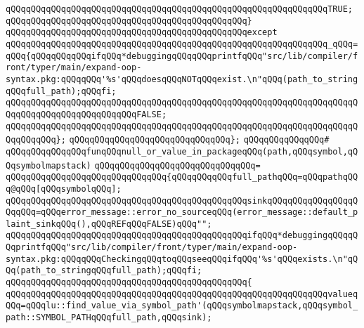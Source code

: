 \verb|qQQqqQQqqQQqqQQqqQQqqQQqqQQqqQQqqQQqqQQqqQQqqQQqqQQqqQQqqQQqqQQqTRUE;|\newline
\verb|qQQqqQQqqQQqqQQqqQQqqQQqqQQqqQQqqQQqqQQqqQQqqQQq}|\newline
\verb|qQQqqQQqqQQqqQQqqQQqqQQqqQQqqQQqqQQqqQQqqQQqqQQqexcept|\newline
\verb|qQQqqQQqqQQqqQQqqQQqqQQqqQQqqQQqqQQqqQQqqQQqqQQqqQQqqQQqqQQqqQQq_qQQq=qQQq{qQQqqQQqqQQqifqQQq*debuggingqQQqqQQqprintfqQQq"src/lib/compiler/front/typer/main/expand-oop-syntax.pkg:qQQqqQQq'%s'qQQqdoesqQQqNOTqQQqexist.\n"qQQq(path_to_stringqQQqfull_path);qQQqfi;|\newline
\newline
\verb|qQQqqQQqqQQqqQQqqQQqqQQqqQQqqQQqqQQqqQQqqQQqqQQqqQQqqQQqqQQqqQQqqQQqqQQqqQQqqQQqqQQqqQQqqQQqqQQqFALSE;|\newline
\verb|qQQqqQQqqQQqqQQqqQQqqQQqqQQqqQQqqQQqqQQqqQQqqQQqqQQqqQQqqQQqqQQqqQQqqQQqqQQqqQQq};|\newline
\verb|qQQqqQQqqQQqqQQqqQQqqQQqqQQqqQQq};|\newline
\newline
\verb|qQQqqQQqqQQqqQQq#|\newline
\verb|qQQqqQQqqQQqqQQqfunqQQqnull_or_value_in_packageqQQq(path,qQQqsymbol,qQQqsymbolmapstack)|\newline
\verb|qQQqqQQqqQQqqQQqqQQqqQQqqQQqqQQq=|\newline
\verb|qQQqqQQqqQQqqQQqqQQqqQQqqQQqqQQq{qQQqqQQqqQQqfull_pathqQQq=qQQqpathqQQq@qQQq[qQQqsymbolqQQq];|\newline
\newline
\verb|qQQqqQQqqQQqqQQqqQQqqQQqqQQqqQQqqQQqqQQqqQQqqQQqsinkqQQqqQQqqQQqqQQqqQQqqQQq=qQQqerror_message::error_no_sourceqQQq(error_message::default_plaint_sinkqQQq(),qQQqREFqQQqFALSE)qQQq"";|\newline
\newline
\verb|qQQqqQQqqQQqqQQqqQQqqQQqqQQqqQQqqQQqqQQqqQQqqQQqifqQQq*debuggingqQQqqQQqprintfqQQq"src/lib/compiler/front/typer/main/expand-oop-syntax.pkg:qQQqqQQqCheckingqQQqtoqQQqseeqQQqifqQQq'%s'qQQqexists.\n"qQQq(path_to_stringqQQqfull_path);qQQqfi;|\newline
\newline
\verb|qQQqqQQqqQQqqQQqqQQqqQQqqQQqqQQqqQQqqQQqqQQqqQQq{|\newline
\verb|qQQqqQQqqQQqqQQqqQQqqQQqqQQqqQQqqQQqqQQqqQQqqQQqqQQqqQQqqQQqqQQqvalueqQQq=qQQqlu::find_value_via_symbol_path'(qQQqsymbolmapstack,qQQqsymbol_path::SYMBOL_PATHqQQqfull_path,qQQqsink);|\newline

